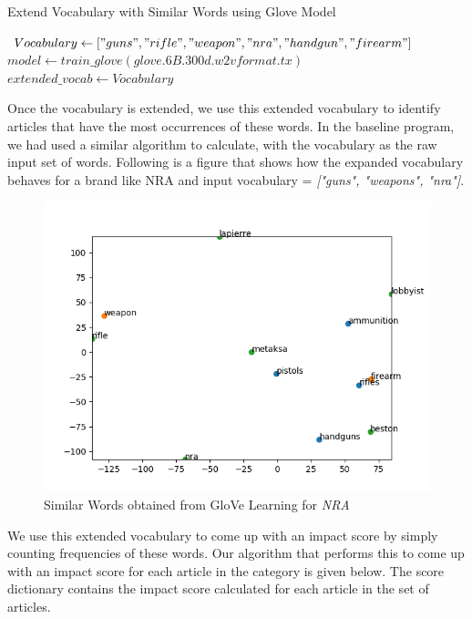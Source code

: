 \documentclass[paper=a4, fontsize=11pt]{scrartcl}
\numberwithin{equation}{section}		%
\numberwithin{figure}{section}			%
\numberwithin{table}{section}				%
\begin{document}
\begin{center}
\begin{algorithm}
  \caption{Extend Vocabulary with Similar Words using Glove Model}

 $Vocabulary \gets ["guns", "rifle", "weapon", "nra", "handgun", "firearm"] $\;
 $model \gets train\_glove(\textit{glove.6B.300d.w2vformat.tx}) $\;
  {
      $extended\_vocab \gets Vocabulary $\;
    \;
  }
\end{algorithm}
\end{center}
Once the vocabulary is extended, we use this extended vocabulary to identify articles that have the most occurrences of these words. In the baseline program, we had used a similar algorithm to calculate, with the vocabulary as the raw input set of words. Following is a figure that shows how the expanded vocabulary behaves for a brand like NRA and input vocabulary = \textit {["guns", "weapons", "nra"]}.

\begin{figure}[ht]
	\centering
 	 \includegraphics[width=0.5\linewidth]{similar_words_nra.png}
	  \caption{Similar Words obtained from GloVe Learning for \textit{NRA}}
 	 \label{fig:Similar Words for NRA}
\end{figure}

We use this extended vocabulary to come up with an impact score by simply counting frequencies of these words. Our algorithm that performs this to come up with an impact score for each article in the category is given below. The score dictionary contains the impact score calculated for each article in the set of articles.
\end{document}
